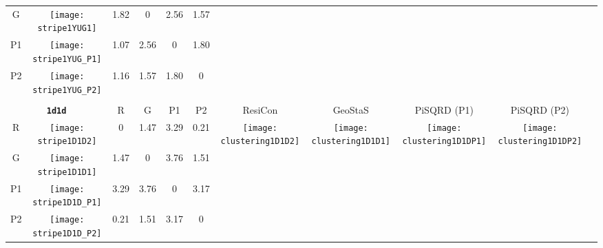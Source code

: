 \documentclass[a4paper,11pt,twoside]{book}%
\begin{document}
\begin{appendices}
\begin{sidewaystable}[h!]
\begin{tabular*}{4cm}{cc|c|c|c|c|c|c|c|c|c|}
\cline{1-6}
\multicolumn{1}{|c|}{G} & \texttt{[image: stripe1YUG1]} & 1.82 & 0 & 2.56 & 1.57 & \multirow{4}{*}{} & \multirow{4}{*}{} & \multirow{4}{*}{} & \multirow{4}{*}{} & \multirow{5}{*}{} \\
\cline{1-6}
\multicolumn{1}{|c|}{P1} & \texttt{[image: stripe1YUG\_P1]} & 1.07 & 2.56 & 0 & 1.80 & \multirow{4}{*}{} & \multirow{4}{*}{} & \multirow{4}{*}{} & \multirow{4}{*}{} & \multirow{5}{*}{}  \\
\cline{1-6}
\multicolumn{1}{|c|}{P2} & \texttt{[image: stripe1YUG\_P2]} & 1.16 & 1.57 & 1.80 & 0 & \multirow{4}{*}{} & \multirow{4}{*}{} & \multirow{4}{*}{} & \multirow{4}{*}{} & \multirow{5}{*}{}  \\
\cline{1-11}
\\
\cline{1-11}
\multicolumn{2}{|c|}{{\bf \texttt{1d1d}}} & R & G & P1 & P2 & ResiCon & GeoStaS & PiSQRD (P1) & PiSQRD (P2) & \multirow{5}{*}{\vspace{-0.15cm}\texttt{[image: threeHistogram1D1D]}}  \\  
\cline{1-10}
\multicolumn{1}{|c|}{R} & \texttt{[image: stripe1D1D2]} & 0 & 1.47 & 3.29 & 0.21 & \multirow{4}{*}{\vspace{-0.3cm}\texttt{[image: clustering1D1D2]}} & \multirow{4}{*}{\vspace{-0.3cm}\texttt{[image: clustering1D1D1]}} & \multirow{4}{*}{\vspace{-0.3cm}\texttt{[image: clustering1D1DP1]}} & \multirow{4}{*}{\vspace{-0.3cm}\texttt{[image: clustering1D1DP2]}} &  \multirow{5}{*}{} \\ 
\cline{1-6}
\multicolumn{1}{|c|}{G} & \texttt{[image: stripe1D1D1]} & 1.47 & 0 & 3.76 & 1.51 & \multirow{4}{*}{} & \multirow{4}{*}{} & \multirow{4}{*}{} & \multirow{4}{*}{} & \multirow{5}{*}{} \\
\cline{1-6}
\multicolumn{1}{|c|}{P1} & \texttt{[image: stripe1D1D\_P1]} & 3.29 & 3.76 & 0 & 3.17 & \multirow{4}{*}{} & \multirow{4}{*}{} & \multirow{4}{*}{} & \multirow{4}{*}{} & \multirow{5}{*}{}  \\
\cline{1-6}
\multicolumn{1}{|c|}{P2} & \texttt{[image: stripe1D1D\_P2]} & 0.21 & 1.51 & 3.17 & 0 & \multirow{4}{*}{} & \multirow{4}{*}{} & \multirow{4}{*}{} & \multirow{4}{*}{} & \multirow{5}{*}{}  \\
\cline{1-11}
\end{tabular*}
\normalfont
\end{sidewaystable}




\end{appendices}
\end{document}
